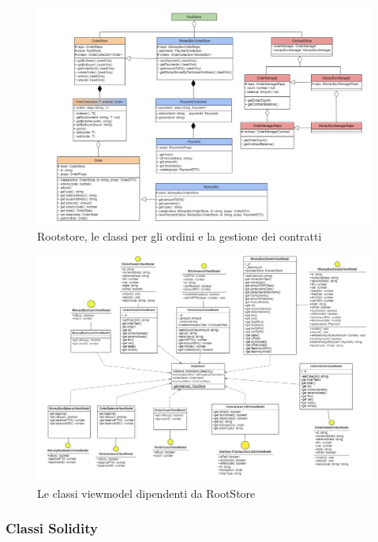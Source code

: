\begin{figure}[H]
    \centering
    \includegraphics[scale = 0.5]{immagini/rootstore.png}
    \caption{Rootstore, le classi per gli ordini e la gestione dei contratti}
\end{figure}

\begin{landscape}
\begin{figure}[H]
    \centering
    \includegraphics[scale = 0.6]{immagini/rsviewmodel.png}
    \caption{Le classi viewmodel dipendenti da RootStore}
\end{figure}
\end{landscape}

\subsubsection{Classi Solidity}

